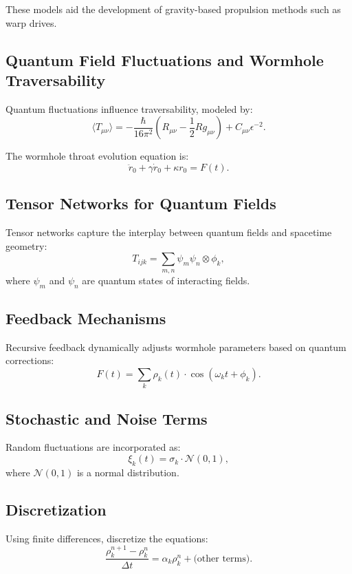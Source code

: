 \documentclass{article}
\theoremstyle{plain}
\begin{document}
\begin{itemize}
\begin{itemize}
These models aid the development of gravity-based propulsion methods such as warp drives.

\subsection{Quantum Field Fluctuations and Wormhole Traversability}
Quantum fluctuations influence traversability, modeled by:
\begin{equation}
\langle T_{\mu\nu} \rangle = - \frac{\hbar}{16\pi^2} \left( R_{\mu\nu} - \frac{1}{2} R g_{\mu\nu} \right) + C_{\mu\nu} \epsilon^{-2}.
\end{equation}

The wormhole throat evolution equation is:
\begin{equation}
\ddot{r}_0 + \gamma \dot{r}_0 + \kappa r_0 = F(t).
\end{equation}

\subsection{Tensor Networks for Quantum Fields}
Tensor networks capture the interplay between quantum fields and spacetime geometry:
\begin{equation}
    T_{ijk} = \sum_{m,n} \psi_m \psi_n \otimes \phi_k,
\end{equation}
where $\psi_m$ and $\psi_n$ are quantum states of interacting fields.

\subsection{Feedback Mechanisms}
Recursive feedback dynamically adjusts wormhole parameters based on quantum corrections:
\begin{equation}
    F(t) = \sum_{k} \rho_k(t) \cdot \cos(\omega_k t + \phi_k).
\end{equation}

\subsection{Stochastic and Noise Terms}
Random fluctuations are incorporated as:
\begin{equation}
    \xi_k(t) = \sigma_k \cdot \mathcal{N}(0,1),
\end{equation}
where $\mathcal{N}(0,1)$ is a normal distribution.

\subsection{Discretization}
Using finite differences, discretize the equations:
\begin{equation}
    \frac{\rho_k^{n+1} - \rho_k^n}{\Delta t} = \alpha_k \rho_k^n + \text{(other terms)}.
\end{equation}


\end{itemize}
\end{itemize}
\end{document}
